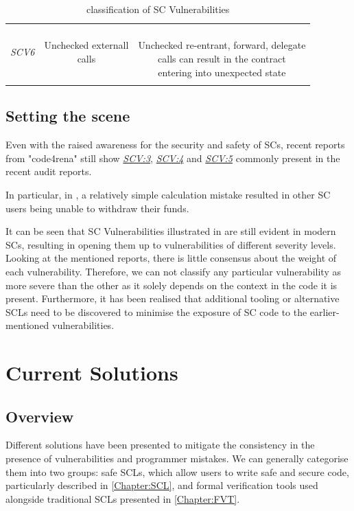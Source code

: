 \documentclass[oneside]{ecsproject}     %
\newcommand{\vref}[1]{\textit{\hyperref[#1]{#1}}}
\begin{document}
\begin{table}[!htb]
\begin{tabular}{ccc}
  \hline
  \textit{SCV6}\label{SCV:6} & \makecell{Unchecked externall\\calls} & \makecell{\\Unchecked re-entrant, forward, delegate\\calls can result in the contract\\entering into unexpected state}\\\\
  \bottomrule
  \end{tabular}
  \caption{classification of SC Vulnerabilities}
  \label{Table:classification}
\end{table}

\section{Setting the scene} \label{Section:Scene}

Even with the raised awareness for the security and safety of SCs, recent reports from "code4rena" still show \vref{SCV:3}, \vref{SCV:4} and \vref{SCV:5}
commonly present in the recent audit reports\cite{arcade_report}\cite{ondo_report}\cite{centrifuge_report}.

In particular, in \cite{centrifuge_report}, a relatively simple calculation mistake resulted in other SC users being unable to withdraw their funds.

It can be seen that SC Vulnerabilities illustrated in  are still evident in modern SCs, resulting in opening them up to vulnerabilities of different severity levels.
Looking at the mentioned reports, there is little consensus about the weight of each vulnerability.
Therefore, we can not classify any particular vulnerability as more severe than the other as it solely depends on the context in the code it is present.
Furthermore, it has been realised that additional tooling or alternative SCLs need to be discovered to minimise the exposure of SC code to the earlier-mentioned vulnerabilities.

\chapter{Current Solutions}

\section{Overview}

Different solutions have been presented to mitigate the consistency in the presence of vulnerabilities and programmer mistakes. 
We can generally categorise them into two groups: safe SCLs, which allow users to write safe and secure code, particularly described in \cref{Chapter:SCL}, 
and formal verification tools used alongside traditional SCLs presented in \cref{Chapter:FVT}.
\end{document}
